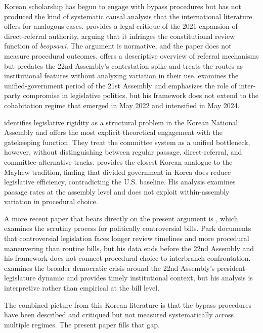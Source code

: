 \documentclass[11pt]{article}
\begin{document}
Korean scholarship has begun to engage with bypass procedures but has not produced the kind of systematic causal analysis that the international literature offers for analogous cases. \citet{parkpy2026} provides a legal critique of the 2021 expansion of direct-referral authority, arguing that it infringes the constitutional review function of \textit{beopsawi}. The argument is normative, and the paper does not measure procedural outcomes. \citet{jang2021} offers a descriptive overview of referral mechanisms but predates the 22nd Assembly's contestation spike and treats the routes as institutional features without analyzing variation in their use. \citet{parkhs2025} examines the unified-government period of the 21st Assembly and emphasizes the role of inter-party compromise in legislative politics, but his framework does not extend to the cohabitation regime that emerged in May 2022 and intensified in May 2024.

\citet{kimlee2026} identifies legislative rigidity as a structural problem in the Korean National Assembly and offers the most explicit theoretical engagement with the gatekeeping function. They treat the committee system as a unified bottleneck, however, without distinguishing between regular passage, direct-referral, and committee-alternative tracks. \citet{leehs2012} provides the closest Korean analogue to the Mayhew tradition, finding that divided government in Korea does reduce legislative efficiency, contradicting the U.S. baseline. His analysis examines passage rates at the assembly level and does not exploit within-assembly variation in procedural choice.

A more recent paper that bears directly on the present argument is \citet{parkhs2020}, which examines the scrutiny process for politically controversial bills. Park documents that controversial legislation faces longer review timelines and more procedural maneuvering than routine bills, but his data ends before the 22nd Assembly and his framework does not connect procedural choice to interbranch confrontation. \citet{jeon2025} examines the broader democratic crisis around the 22nd Assembly's president-legislature dynamic and provides timely institutional context, but his analysis is interpretive rather than empirical at the bill level.

The combined picture from this Korean literature is that the bypass procedures have been described and critiqued but not measured systematically across multiple regimes. The present paper fills that gap.
\end{document}
